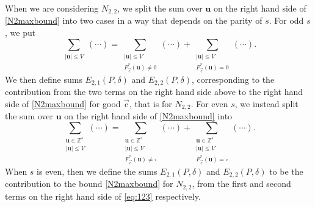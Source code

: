 \documentclass[letterpaper,11pt]{amsart}
\numberwithin{equation}{section}
\theoremstyle{definition}
\numberwithin{equation}{section}
\newcommand{\ZZ}{\mathbb{Z}}
\newcommand{\uu}{\mathbf{u}}
\newcommand{\uc}{{\vec{\mathrm{c}}}}
\begin{document}
When  we are considering $N_{2,2}$, we split the sum over $\uu$ on the right hand side of \eqref{N2maxbound} into two cases in a way that depends on the parity of $s$. For odd $s$, we put
\begin{equation}\label{E-two}
\sum_{\substack{|\uu|\leq V}}(\cdots)=\sum_{\substack{|\uu|\leq V\\ F_\uc^*(\uu)\neq 0}}(\cdots)+\sum_{\substack{|\uu|\leq V\\ F_\uc^*(\uu)= 0}}(\cdots).
\end{equation}
We then define sums \(E_{2,1}(P, \delta)\) and \(E_{2,2}(P, \delta)\), corresponding to the contribution from the two terms on the right hand side above to the right hand side of \eqref{N2maxbound} for good $ \uc$, that is for $N_{2,2}$.
For even $s$,
we  instead split the sum over $\uu$ on the right hand side of \eqref{N2maxbound} into 
\begin{equation}\label{eq:123}
\sum_{\substack{\uu\in\ZZ^s\\ |\uu|\leq V}}(\cdots)=\sum_{\substack{\uu\in\ZZ^s\\ |\uu|\leq V\\ F_\uc^*(\uu)\neq\square }}(\cdots)+\sum_{\substack{\uu\in\ZZ^s\\ |\uu|\leq V\\ F_\uc^*(\uu)=\square }}(\cdots).
\end{equation}
 When $s$ is even, then we define the sums \(E_{2,1}(P, \delta)\) and \(E_{2,2}(P, \delta)\) to be the contribution to the bound \eqref{N2maxbound} for $N_{2,2}$, from the first and second terms on the right hand side of \eqref{eq:123} respectively.

\end{document}
